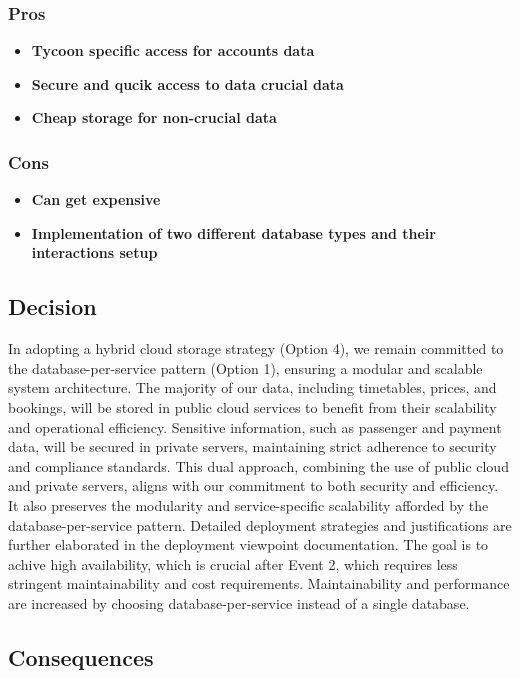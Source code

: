 \subsubsection*{Pros}
\begin{itemize}[noitemsep]
    \item \textbf{Tycoon specific access for accounts data} 
    \item \textbf{Secure and qucik access to data crucial data} 
    \item \textbf{Cheap storage for non-crucial data} 
\end{itemize}

\subsubsection*{Cons}
\begin{itemize}[noitemsep]
    \item \textbf{Can get expensive} 
    \item \textbf{Implementation of two different database types and their interactions setup}
\end{itemize}

\subsection*{Decision}

In adopting a hybrid cloud storage strategy (Option 4), we remain committed to the database-per-service pattern (Option 1), ensuring a modular and scalable system architecture. The majority of our data, including timetables, prices, and bookings, will be stored in public cloud services to benefit from their scalability and operational efficiency. Sensitive information, such as passenger and payment data, will be secured in private servers, maintaining strict adherence to security and compliance standards. This dual approach, combining the use of public cloud and private servers, aligns with our commitment to both security and efficiency. It also preserves the modularity and service-specific scalability afforded by the database-per-service pattern. Detailed deployment strategies and justifications are further elaborated in the deployment viewpoint documentation.
The goal is to achive high availability, which is crucial after Event 2, which requires less stringent maintainability and cost requirements. Maintainability and performance are increased by choosing database-per-service instead of a single database.

\subsection*{Consequences}

